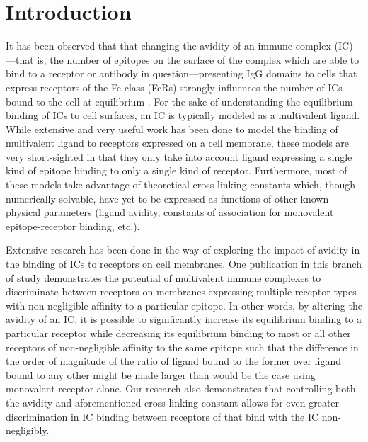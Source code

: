 \section{Introduction}

It has been observed that that changing the avidity of an immune complex (IC)---that is, the number of epitopes on the surface of the complex which are able to bind to a receptor or antibody in question---presenting IgG domains to cells that express receptors of the Fc\textgamma{} class (Fc\textgamma{}Rs) strongly influences the number of ICs bound to the cell at equilibrium \cite{Lux:2013iv, Bruhns:2009kg}.  For the sake of understanding the equilibrium binding of ICs to cell surfaces, an IC is typically modeled as a multivalent ligand. While extensive and very useful work has been done to model the binding of multivalent ligand to receptors expressed on a cell membrane, these models are very short-sighted in that they only take into account ligand expressing a single kind of epitope binding to only a single kind of receptor. Furthermore, most of these models take advantage of theoretical cross-linking constants which, though numerically solvable, have yet to be expressed as functions of other known physical parameters (ligand avidity, constants of association for monovalent epitope-receptor binding, etc.).

Extensive research has been done in the way of exploring the impact of avidity in the binding of ICs to receptors on cell membranes. One publication in this branch of study demonstrates the potential of multivalent immune complexes to discriminate between receptors on membranes expressing multiple receptor types with non-negligible affinity to a particular epitope. In other words, by altering the avidity of an IC, it is possible to significantly increase its equilibrium binding to a particular receptor while decreasing its equilibrium binding to most or all other receptors of non-negligible affinity to the same epitope such that the difference in the order of magnitude of the ratio of ligand bound to the former over ligand bound to any other might be made larger than would be the case using monovalent receptor alone. Our research also demonstrates that controlling both the avidity and aforementioned cross-linking constant allows for even greater discrimination in IC binding between receptors of that bind with the IC non-negligibly.